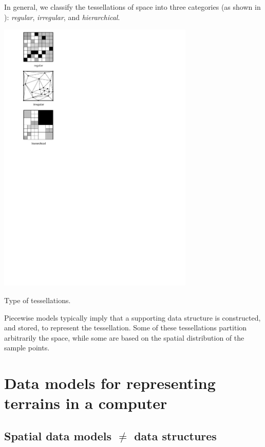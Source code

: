 In general, we  classify the tessellations of space into three categories (as shown in ): \emph{regular}, \emph{irregular}, and \emph{hierarchical}.%
\begin{marginfigure}
  \centering
  \includegraphics[width=0.7\textwidth]{figs/tesstype}
  \caption{Type of tessellations.}%
\end{marginfigure}

%

Piecewise models typically imply that a supporting data structure is constructed, and stored, to represent the tessellation.
Some of these tessellations partition arbitrarily the space, while some are based on the spatial distribution of the sample points.


%
\section[Data models for terrains]{Data models for representing terrains in a computer}

\subsection{Spatial data models $\neq$ data structures}


